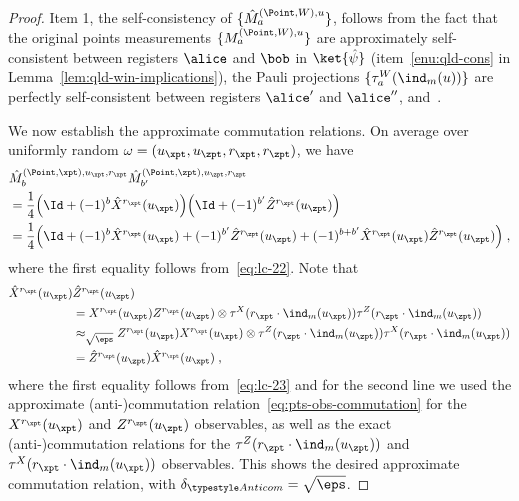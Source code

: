 \begin{proof}
Item 1, the self-consistency of $\{\hat{M}^{(\Point,W),u}_a \}$, follows from the fact that the original points measurements $\{ M^{(\Point,W),u}_a \}$ are approximately self-consistent between registers $\alice$ and $\bob$ in $\ket{\hat{\psi}}$ (item~\ref{enu:qld-cons} in Lemma~\ref{lem:qld-win-implications}), the Pauli projections $\{\tau^W_a(\ind_m(u))\}$ are perfectly self-consistent between registers $\alice'$ and $\alice''$, and~. 
	
	We now establish the approximate commutation relations. On average over uniformly random $\omega = (u_\xpt,u_\zpt,r_\xpt,r_\zpt)$, we have
	\begin{align*}
	&\hat{M}^{(\Point,\xpt),u_\xpt,r_\xpt}_{b} \hat{M}^{(\Point,\zpt),u_\zpt,r_\zpt}_{b'}  \label{eq:qld-m-x-m-z} \\
	&= \frac{1}{4} \Big ( \Id + (-1)^b \hat{X}^{r_\xpt}(u_\xpt) \Big ) \Big ( \Id + (-1)^{b'} \hat{Z}^{r_\zpt}(u_\zpt) \Big ) \\
	&= \frac{1}{4} \Big ( \Id + (-1)^b \hat{X}^{r_\xpt}(u_\xpt) + (-1)^{b'} \hat{Z}^{r_\zpt}(u_\zpt) + (-1)^{b + b'} \hat{X}^{r_\xpt}(u_\xpt) \hat{Z}^{r_\zpt}(u_\zpt) \Big)\;,
	\end{align*}
	where the first equality follows from~\eqref{eq:lc-22}.	
	Note that
	\begin{align*}
	\hat{X}^{r_\xpt}(u_\xpt)
         & \hat{Z}^{r_\zpt}(u_\zpt) \\
				&=
                                             X^{r_\xpt}(u_\xpt)
                                             Z^{r_\zpt}(u_\zpt)
                                             \otimes \tau^X(r_\xpt
                                             \cdot \ind_m(u_\xpt))
                                             \tau^Z(r_\zpt \cdot \ind_m(u_\zpt)) \\
	&\approx_{\sqrt{\eps}} Z^{r_\zpt}(u_\zpt)
   X^{r_\xpt}(u_\xpt)  \otimes \tau^Z(r_\zpt\cdot \ind_m( u_\zpt))
   \tau^X(r_\xpt \cdot \ind_m(u_\xpt)) \\
	&= \hat{Z}^{r_\zpt}(u_\zpt) \hat{X}^{r_\xpt}(u_\xpt)\;, 
	\end{align*}
	where the first equality follows from~\eqref{eq:lc-23} and for the second line we used the approximate (anti-)commutation
        relation~\eqref{eq:pts-obs-commutation} for the
        $X^{r_\xpt}(u_\xpt)$ and  $Z^{r_\zpt}(u_\zpt)$
        observables, as well as the exact (anti-)commutation relations
        for the $\tau^Z(r_\zpt \cdot \ind_m(u_\zpt))$ and
        $\tau^X(r_\xpt \cdot \ind_m(u_\xpt))$ observables. This shows
        the desired approximate commutation relation, with
        $\delta_{\acom} = \sqrt{\eps}$.
\end{proof}

